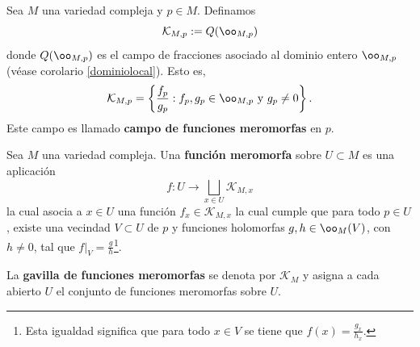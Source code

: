 \begin{definition}
	Sea $M$ una variedad compleja y $p\in M$. Definamos
	\begin{equation*}
		\mathcal{K}_{M,p}:=Q(\oo_{M,p})
	\end{equation*}
	donde $Q(\oo_{M,p})$ es el campo de fracciones asociado al dominio entero $\oo_{M,p}$ (véase corolario \ref{dominiolocal}). Esto es,
	\begin{equation*}
		\mathcal{K}_{M,p}=\left\{ \frac{f_p}{g_p}:f_p,g_p\in\oo_{M,p}\text{ y }g_p\neq 0\right\}.
	\end{equation*}
	Este campo es llamado \textbf{campo de funciones meromorfas} en $p$.
\end{definition}  

\begin{definition}
	Sea $M$ una variedad compleja. Una \textbf{función meromorfa} sobre $U\subset M$ es una aplicación
	\begin{equation*}
		f:U\longrightarrow \bigsqcup_{x\in U}\mathcal{K}_{M,x}
	\end{equation*}
	la cual asocia a $x\in U$ una función $f_x\in \mathcal{K}_{M,x}$ la cual cumple que para todo $p\in U$, existe una vecindad $V\subset U$ de $p$ y funciones holomorfas $g,h\in\oo_M(V)$, con $h\neq 0$, tal que $f|_V=\frac{g}{h}$\footnote{Esta igualdad significa que para todo $x\in V$ se tiene que $f(x)=\frac{g_x}{h_x}$.}.
\end{definition}

La \textbf{gavilla de funciones meromorfas} se denota por $\mathcal{K}_{M}$ y asigna a cada abierto $U$ el conjunto de funciones meromorfas sobre $U$.

